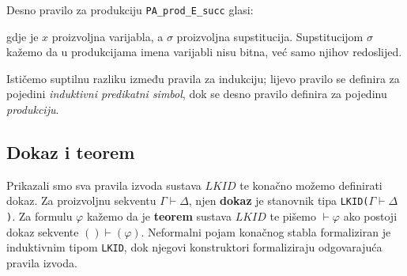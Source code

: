 \begin{example}
  Desno pravilo za produkciju \texttt{PA\_prod\_E\_succ} glasi:
  \begin{prooftree}
  \end{prooftree}
  \noindent gdje je \(x\) proizvoljna varijabla, a \(\sigma\) proizvoljna supstitucija.
  Supstitucijom \(\sigma\) kažemo da u produkcijama imena varijabli nisu bitna,
  već samo njihov redoslijed.
\end{example}

Ističemo suptilnu razliku između pravila za indukciju;
lijevo pravilo se definira za pojedini \textit{induktivni predikatni simbol},
dok se desno pravilo definira za pojedinu \textit{produkciju}.

\subsection{Dokaz i teorem}
Prikazali smo sva pravila izvoda sustava \(\mathit{LKID}\) te konačno možemo definirati dokaz.
Za proizvoljnu sekventu \(\Gamma \vdash \Delta\), njen \textbf{dokaz} je stanovnik tipa \texttt{LKID(\(\Gamma \vdash \Delta\))}.
Za formulu \(\varphi\) kažemo da je \textbf{teorem} sustava \(\mathit{LKID}\) te
pišemo \(\vdash \varphi\) ako postoji dokaz sekvente \( () \vdash (\varphi)\).
Neformalni pojam konačnog stabla formaliziran je induktivnim tipom \texttt{LKID},
dok njegovi konstruktori formaliziraju odgovarajuća pravila izvoda.

